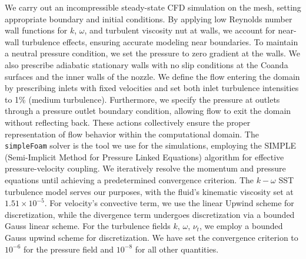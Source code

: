 We carry out an incompressible steady-state CFD simulation on the mesh, setting appropriate boundary and initial conditions. By applying low Reynolds number wall functions for $k$, \( \omega \), and turbulent viscosity \gls{nut} at walls, we account for near-wall turbulence effects, ensuring accurate modeling near boundaries. To maintain a neutral pressure condition, we set the pressure to zero gradient at the walls. We also prescribe adiabatic stationary walls with no slip conditions at the Coanda surfaces and the inner walls of the nozzle. We define the flow entering the domain by prescribing inlets with fixed velocities and set both inlet turbulence intensities to 1\% (medium turbulence). Furthermore, we specify the pressure at outlets through a pressure outlet boundary condition, allowing flow to exit the domain without reflecting back. These actions collectively ensure the proper representation of flow behavior within the computational domain. The \verb|simpleFoam| solver is the tool we use for the simulations, employing the SIMPLE (Semi-Implicit Method for Pressure Linked Equations) algorithm for effective pressure-velocity coupling. We iteratively resolve the momentum and pressure equations until achieving a predetermined convergence criterion. The $k-\omega$ SST turbulence model serves our purposes, with the fluid's kinematic viscosity set at $1.51 \times {10}^{-5}$. For velocity's convective term, we use the linear Upwind scheme for discretization, while the divergence term undergoes discretization via a bounded Gauss linear scheme. For the turbulence fields $k$, $\omega$, $\nu_t$, we employ a bounded Gauss upwind scheme for discretization. We have set the convergence criterion to ${10}^{-6}$ for the pressure field and ${10}^{-8}$ for all other quantities.

